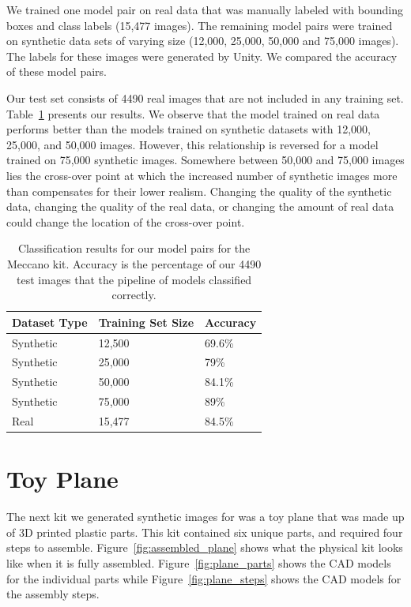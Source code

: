 We trained one model pair on real data that was manually labeled with
bounding boxes and class labels (15,477 images).
The remaining model pairs were trained on synthetic data sets of varying size
(12,000, 25,000, 50,000 and 75,000 images).
The labels for these images were generated by Unity.
We compared the accuracy of these model pairs.

Our test set consists of 4490 real images that are not included in any
training set.  Table~\ref{tab:meccano_accuracy} presents our results.  We
observe that the model trained on real data performs better than the
models trained on synthetic datasets with 12,000, 25,000, and 50,000
images.  However, this relationship is reversed for a model trained on
75,000 synthetic images.
Somewhere between 50,000 and 75,000 images
lies the cross-over point at which the increased number of synthetic
images more than compensates for their lower realism.
Changing the quality of the synthetic data, changing the quality of the real
data, or changing the amount of real data could change the location of the
cross-over point.

\begin{table}
  \centering
\begin{tabular}{|l||l|l|}
\hline
  Dataset Type & Training Set Size & Accuracy\\
  \hline
  \hline
  Synthetic & 12,500 & 69.6\%\\
  Synthetic & 25,000 & 79\%\\
  Synthetic & 50,000 & 84.1\%\\
  Synthetic & 75,000 & 89\%\\
  \hline
  Real & 15,477 & 84.5\%\\
\hline
\end{tabular}
  \caption{
    Classification results for our model pairs for the Meccano kit.
    Accuracy is the percentage of our 4490 test images that the pipeline of
    models classified correctly.
  }\label{tab:meccano_accuracy}
\end{table}

\section{Toy Plane}

The next kit we generated synthetic images for was a toy plane that was made up
of 3D printed plastic parts.
This kit contained six unique parts, and required four steps to assemble.
Figure~\ref{fig:assembled_plane} shows what the physical kit looks like when it
is fully assembled.
Figure~\ref{fig:plane_parts} shows the CAD models for the individual parts while
Figure~\ref{fig:plane_steps} shows the CAD models for the assembly steps.

